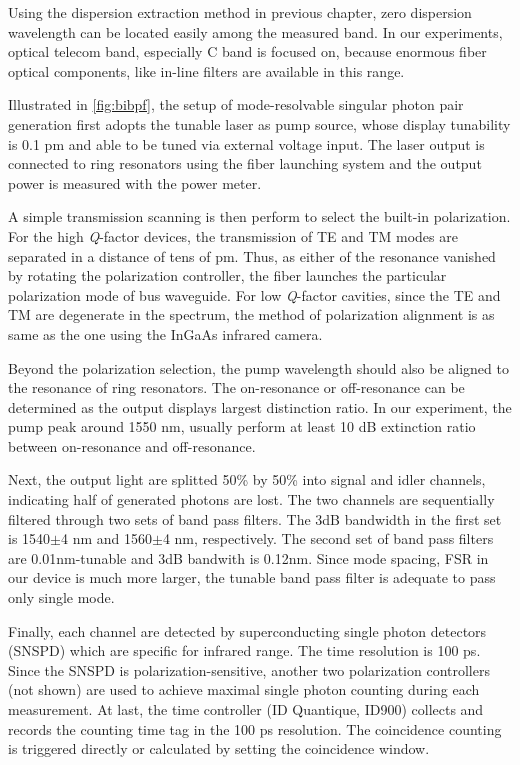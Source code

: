 Using the dispersion extraction method in previous chapter, zero dispersion wavelength can be located easily among the measured band. In our experiments, optical telecom band, especially C band is focused on, because enormous fiber optical components, like in-line filters are available in this range.

Illustrated in \autoref{fig:bibpf}, the setup of mode-resolvable singular photon pair generation first adopts the tunable laser as pump source, whose display tunability is 0.1 pm and able to be tuned via external voltage input. The laser output is connected to ring resonators using the fiber launching system and the output power is measured with the power meter. 

A simple transmission scanning is then perform to select the built-in polarization.
For the high \textit{Q}-factor devices, the transmission of TE and TM modes are separated in a distance of tens of pm. Thus, as either of the resonance vanished by rotating the polarization controller, the fiber launches the particular polarization mode of bus waveguide. For low \textit{Q}-factor cavities, since the TE and TM are degenerate in the spectrum, the method of polarization alignment is as same as the one using the InGaAs infrared camera.

Beyond the polarization selection, the pump wavelength should also be aligned to the resonance of ring resonators. The on-resonance or off-resonance can be determined as the output displays largest distinction ratio. In our experiment, the pump peak around 1550 nm, usually perform at least 10 dB extinction ratio between on-resonance and off-resonance.

Next, the output light are splitted 50\si{\percent} by 50\si{\percent} into signal and idler channels, indicating half of generated photons are lost. The two channels are sequentially filtered through two sets of band pass filters. The 3dB bandwidth in the first set is 1540$\pm$4 nm and 1560$\pm$4 nm, respectively. The second set of band pass filters are 0.01nm-tunable and 3dB bandwith is 0.12nm. Since mode spacing, FSR in our device is much more larger, the tunable band pass filter is adequate to pass only single mode.

Finally, each channel are detected by superconducting single photon detectors (SNSPD) which are specific for infrared range. The time resolution is 100 ps. Since the SNSPD is polarization-sensitive, another two polarization controllers (not shown) are used to achieve maximal single photon counting during each measurement. At last, the time controller (ID Quantique, ID900) collects and records the counting time tag in the 100 ps resolution. The coincidence counting is triggered directly or calculated by setting the coincidence window. 

